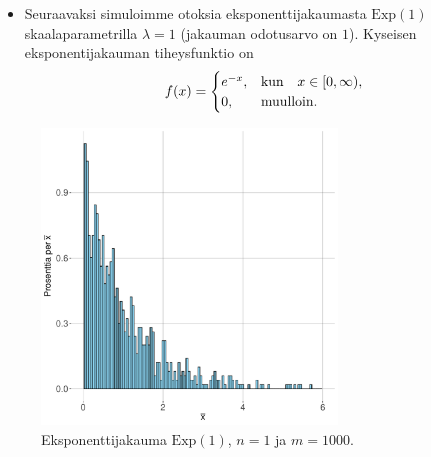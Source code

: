 \documentclass{beamer}
\begin{document}

\begin{frame}
  \begin{itemize}
    \item Seuraavaksi simuloimme otoksia eksponenttijakaumasta $\mathrm{Exp}(1)$
    skaalaparametrilla $\lambda = 1$ (jakauman odotusarvo on $1$). Kyseisen
    eksponentijakauman tiheysfunktio on
    \begin{equation*}
      f(x) =
      \begin{cases}
        e^{-x}, &\textnormal{kun}\quad x\in[0,\infty), \\
        0, &\textnormal{muulloin}. 
      \end{cases}
    \end{equation*}
  \end{itemize}
\end{frame}


\begin{frame}
  \begin{center}
    \begin{figure}
      \includegraphics[width=0.7\textwidth, height=0.7\textwidth]{exp-n-1.pdf}
      \caption{Eksponenttijakauma $\mathrm{Exp}\left(1\right)$, $n = 1$ ja $m = 1000$.}
  \end{figure}
\end{center}
\end{frame}

\end{document}
